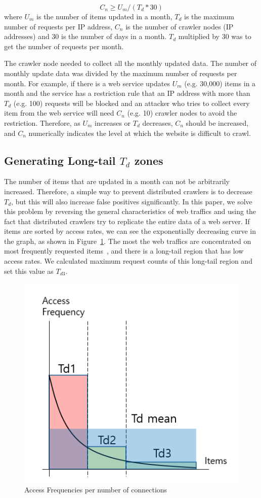 \documentclass[sigconf,review]{acmart}
\begin{document}
\begin{equation}
C_n \geq U_m / (T_d * 30) 
\end{equation}
where $U_m$ is the number of items updated in a month, $T_d$ is the maximum number of requests per IP address, $C_n$ is the number of crawler nodes (IP addresses) and 30 is the number of days in a month. $T_d$ multiplied by 30 was to get the number of requests per month. 

The crawler node needed to collect all the monthly updated data. The number of monthly update data was divided by the maximum number of requests per month. 
For example, if there is a web service updates $U_m$ (e.g. 30,000) items in a month and the service has a restriction rule that an IP address with more than $T_d$ (e.g. 100) requests will be blocked and an attacker who tries to collect every item from the web service will need $C_n$ (e.g. 10) crawler nodes to avoid the restriction. Therefore, as $U_m$ increases or $T_d$ decreases, $C_n$ should be increased, and $C_n$ numerically indicates the level at which the website is difficult to crawl.

\subsection{Generating Long-tail $T_d$ zones}
The number of items that are updated in a month can not be arbitrarily increased. Therefore, a simple way to prevent distributed crawlers is to decrease $T_d$, but this will also increase false positives significantly. In this paper, we solve this problem by reversing the general characteristics of web traffics and using the fact that distributed crawlers try to replicate the entire data of a web server.
If items are sorted by access rates, we can see the exponentially decreasing curve in the graph, as shown in Figure~\ref{fig:fig1}. The most the web traffics are concentrated on most frequently requested items~\cite{r3}, and there is a long-tail region that has low access rates. We calculated maximum request counts of this long-tail region and set this value as $T_{d3}$.

\begin{figure}[H]
    \includegraphics[width=0.7\columnwidth]{figs/figure_01.png}
    \caption{Access Frequencies per number of connections}
    \label{fig:fig1}
\end{figure}
\end{document}
